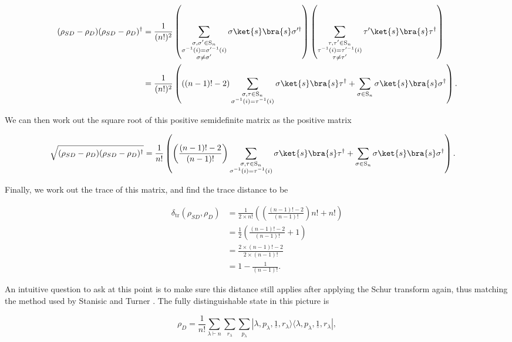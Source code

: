 \begin{align}
(\rho_{SD} - \rho_D)(\rho_{SD} - \rho_D)^\dagger &= \frac{1}{(n!)^2}\left(\sum_{\substack{\sigma,\sigma'\in\textrm{S}_n\\\sigma^{-1}(i)=\sigma'^{-1}(i)\\\sigma\neq\sigma'}}\sigma\ket{s}\bra{s}\sigma'^\dagger\right)\left(\sum_{\substack{\tau,\tau'\in\textrm{S}_n\\\tau^{-1}(i)=\tau'^{-1}(i)\\\tau\neq\tau'}}\tau'\ket{s}\bra{s}\tau^\dagger\right)\\
&= \frac{1}{(n!)^2}\left(((n-1)! - 2)\sum_{\substack{\sigma,\tau\in\textrm{S}_n\\\sigma^{-1}(i)=\tau^{-1}(i)}}\sigma\ket{s}\bra{s}\tau^\dagger + \sum_{\sigma \in \textrm{S}_n}\sigma\ket{s}\bra{s}\sigma^\dagger\right).
\end{align}

\noindent We can then work out the square root of this positive semidefinite matrix as the positive matrix

\begin{align}
\sqrt{(\rho_{SD} - \rho_D)(\rho_{SD} - \rho_D)^\dagger} &= \frac{1}{n!}\left(\left(\frac{(n-1)!-2}{(n-1)!}\right)\sum_{\substack{\sigma,\tau\in\textrm{S}_n\\\sigma^{-1}(i)=\tau^{-1}(i)}}\sigma\ket{s}\bra{s}\tau^\dagger + \sum_{\sigma \in \textrm{S}_n}\sigma\ket{s}\bra{s}\sigma^\dagger\right).
\end{align}

\noindent Finally, we work out the trace of this matrix, and find the trace distance to be

\begin{align}
\delta_{\mathrm{tr}}(\rho_{SD}, \rho_D) &= \frac{1}{2\times n!}\left(\left(\frac{(n-1)!-2}{(n-1)!}\right)n! + n!\right)\\
&= \frac{1}{2}\left(\frac{(n-1)!-2}{(n-1)!} + 1\right)\\
&= \frac{2 \times (n-1)! - 2}{2 \times (n-1)!}\\
&= 1 - \frac{1}{(n-1)!}.
\end{align}

An intuitive question to ask at this point is to make sure this distance still applies after applying the Schur transform again, thus matching the method used by Stanisic and Turner \cite{stanisic2018}. The fully distinguishable state in this picture is

\begin{equation}
\rho_D = \frac{1}{n!} \sum_{\lambda \vdash n} \sum_{r_\lambda} \sum_{p_\lambda} |\lambda,p_\lambda,\underline{1}, r_\lambda\rangle\langle \lambda,p_\lambda,\underline{1}, r_\lambda|,
\end{equation}

